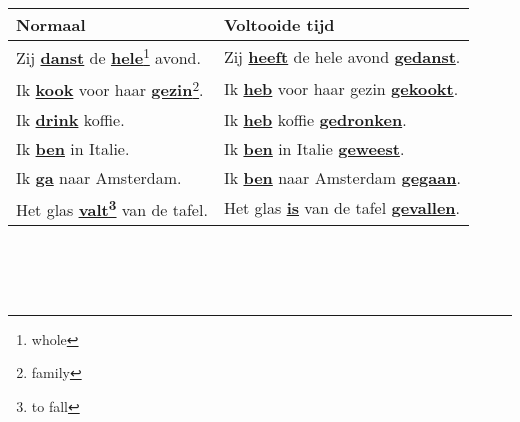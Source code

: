 \documentclass[a4paper,14pt]{extarticle}
\newcommand{\note}[2]{\underline{\textbf{#1}}\footnote{#2}}
\newcommand{\emp}[1]{\underline{\textbf{#1}}}
\begin{document}
\begin{tabularx}{\textwidth}{p{} p{}}
    \hline
    \textbf{Normaal} & \textbf{Voltooide tijd} \\
    \hline
    Zij \emp{danst} de \note{hele}{whole} avond. & Zij \emp{heeft} de hele avond \emp{gedanst}. \\
    Ik \emp{kook} voor haar \note{gezin}{family}. & Ik \emp{heb} voor haar gezin \emp{gekookt}. \\
    Ik \emp{drink} koffie. & Ik \emp{heb} koffie \emp{gedronken}. \\
    Ik \emp{ben} in Italie. & Ik \emp{ben} in Italie \emp{geweest}. \\
    Ik \emp{ga} naar Amsterdam. & Ik \emp{ben} naar Amsterdam \emp{gegaan}. \\
    Het glas \emp{\note{valt}{to fall}} van de tafel. & Het glas \emp{is} van de tafel \emp{gevallen}. \\
\end{tabularx} \\ \\ \\
\end{document}
